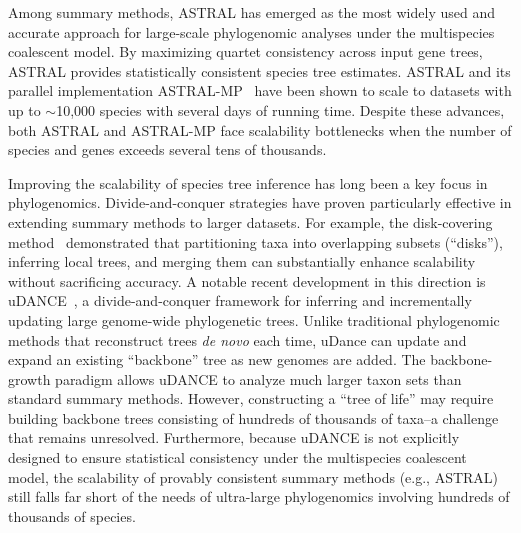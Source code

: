 \documentclass[10pt,a4paper]{article}
\begin{document}
Among summary methods, ASTRAL has emerged as the most widely used and accurate approach for large-scale phylogenomic analyses under the multispecies coalescent model. By maximizing quartet consistency across input gene trees, ASTRAL provides statistically consistent species tree estimates. ASTRAL and its parallel implementation ASTRAL-MP~\cite{astral-mp} have been shown to scale to datasets with up to $\sim$10,000 species with several days of running time. Despite these advances, both ASTRAL and ASTRAL-MP face scalability bottlenecks when the number of species and genes exceeds several tens of thousands.

Improving the scalability of species tree inference has long been a key focus in phylogenomics. Divide-and-conquer strategies have proven particularly effective in extending summary methods to larger datasets. For example, the disk-covering method~\cite{dcm-boosting}  demonstrated that partitioning taxa into overlapping subsets (``disks''), inferring local trees, and merging them can substantially enhance scalability without sacrificing accuracy. %
A notable recent development in this direction is uDANCE~\cite{udance}, a divide-and-conquer framework for inferring and incrementally updating large genome-wide phylogenetic trees. Unlike traditional phylogenomic methods that reconstruct trees \textit{de novo} each time, uDance can  update and expand an existing ``backbone'' tree as new genomes are added. %
The backbone-growth paradigm allows uDANCE to analyze much larger taxon sets than standard  summary methods. However, constructing a  ``tree of life'' may require building backbone trees consisting of hundreds of thousands of taxa--a challenge that remains unresolved. Furthermore, because uDANCE is not explicitly designed to ensure statistical consistency under the multispecies coalescent model, the scalability of provably consistent summary methods (e.g., ASTRAL) still falls far short of the needs of ultra-large phylogenomics involving hundreds of thousands of species.
\end{document}
